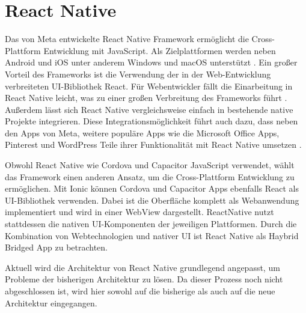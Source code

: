 \section{React Native}
\label{sec:Frameorks_ReactNative}

Das von Meta entwickelte React Native Framework ermöglicht die Cross-Plattform Entwicklung mit JavaScript.
Als Zielplattformen werden neben Android und iOS unter anderem Windows und macOS unterstützt \cite{ReactNative}.
Ein großer Vorteil des Frameworks ist die Verwendung der in der Web-Entwicklung verbreiteten \ac{UI}-Bibliothek React.
Für Webentwickler fällt die Einarbeitung in React Native leicht, was zu einer großen Verbreitung des Frameworks führt \cite{Appfigures_TopSDKs,Stackoverflow_2022}.
Außerdem lässt sich React Native vergleichsweise einfach in bestehende native Projekte integrieren.
Diese Integrationsmöglichkeit führt auch dazu, dass neben den Apps von Meta, weitere populäre Apps wie die Microsoft Office Apps, Pinterest und WordPress Teile ihrer Funktionalität mit React Native umsetzen \cite{ReactNative_Showcase}.


Obwohl React Native wie Cordova und Capacitor JavaScript verwendet, wählt das Framework einen anderen Ansatz, um die Cross-Plattform Entwicklung zu ermöglichen.
Mit Ionic können Cordova und Capacitor Apps ebenfalls React als \ac{UI}-Bibliothek verwenden.
Dabei ist die Oberfläche komplett als Webanwendung implementiert und wird in einer WebView dargestellt.
ReactNative nutzt stattdessen die nativen \ac{UI}-Komponenten der jeweiligen Plattformen.
Durch die Kombination von Webtechnologien und nativer \ac{UI} ist React Native als Haybrid Bridged App zu betrachten.


Aktuell wird die Architektur von React Native grundlegend angepasst, um Probleme der bisherigen Architektur zu lösen.
Da dieser Prozess noch nicht abgeschlossen ist, wird hier sowohl auf die bisherige als auch auf die neue Architektur eingegangen.

